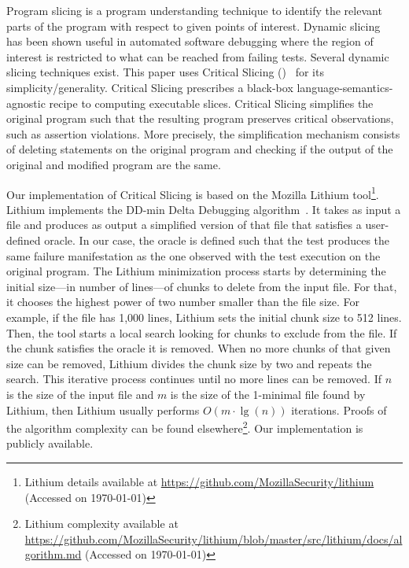 \documentclass{article}
\begin{document}
Program slicing is a program understanding technique to identify the
relevant parts of the program with respect to given points of
interest.  Dynamic
slicing~\cite{Agrawal:1990:DPS:93542.93576}
has been shown useful in automated software debugging where the region
of interest is restricted to what can be reached from failing
tests. Several dynamic slicing techniques exist. This paper uses
Critical Slicing (\cs{})~\cite{DeMillo:1996:CSS:229000.226310} for its
simplicity/generality. Critical Slicing
prescribes a black-box language-semantics-agnostic recipe to computing
executable slices.  Critical Slicing simplifies the original
program such that the resulting program preserves critical
observations, such as assertion violations. More precisely, the
simplification mechanism consists of deleting statements on the
original program and checking if the output of the original and
modified program are the same.

Our implementation of Critical Slicing is based on the Mozilla Lithium
tool\footnote{Lithium details available at \url{https://github.com/MozillaSecurity/lithium} (Accessed on \today)}. Lithium implements the DD-min Delta Debugging
algorithm~\cite{zeller-hildebrandt-tse2002}. It takes as input a file
and produces as output a simplified version of that file that
satisfies a user-defined oracle. In our case, the oracle is defined
such that the test produces the same failure manifestation as the one
observed with the test execution on the original program. The
Lithium minimization process starts by determining the initial size---in number of lines---of
chunks to delete from the input file. For that,
it chooses the highest power of two number smaller than the file
size. For example, if the file has 1,000 lines, Lithium sets the
initial chunk size to 512 lines. Then, the tool starts a local search looking 
for chunks to exclude from the file. If the chunk satisfies the oracle it is removed. 
When no more chunks of that given size can be removed, Lithium
divides the chunk size by two and repeats the search. This iterative
process continues until no more lines can be removed.  If $n$ is the
size of the input file and $m$ is the size of the 1-minimal file found
by Lithium, then Lithium usually performs $O(m\cdot\lg(n))$
iterations. Proofs of the algorithm complexity can be found
elsewhere\footnote{Lithium complexity available at \url{https://github.com/MozillaSecurity/lithium/blob/master/src/lithium/docs/algorithm.md} (Accessed on \today)}. Our implementation is publicly
available.
\end{document}
